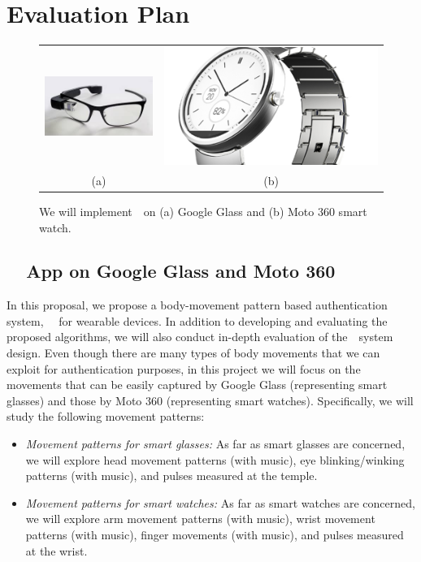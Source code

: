 \section{Evaluation Plan}\label{sec:eval}

\begin{figure}\centering
\begin{tabular}{cc}
\includegraphics[width=0.45\linewidth]{../figure/glass1.jpg} &
\includegraphics[width=0.45\linewidth]{../figure/moto} \\
(a) & (b) \\
\end{tabular}
    \caption{\label{fig:devices} We will implement~\systemname~on (a) Google Glass and (b) Moto 360 smart watch.}
\vspace{-6pt}
\end{figure}
\subsection{~\systemname~App on Google Glass and Moto 360}\label{subsec:app}
In this proposal, we propose a body-movement pattern based authentication system, ~\systemname~for 
wearable devices. In addition to developing and evaluating the proposed algorithms, we will also conduct in-depth evaluation of the~\systemname~system design. Even though there are many types of body movements that we can exploit for authentication purposes, in this project we will focus on the movements that can be easily captured by Google Glass (representing smart glasses) and those by Moto 360 (representing smart watches). Specifically, we will study the following movement patterns:
\begin{itemize}
\item \emph{Movement patterns for smart glasses:} As far as smart glasses are concerned, we will explore head movement patterns (with music), eye blinking/winking patterns (with music), and pulses measured at the temple. 

\item \emph{Movement patterns for smart watches:} As far as smart watches are concerned, we will explore arm movement patterns (with music), wrist movement patterns (with music), finger movements (with music), and pulses measured at the wrist.
\end{itemize}  


